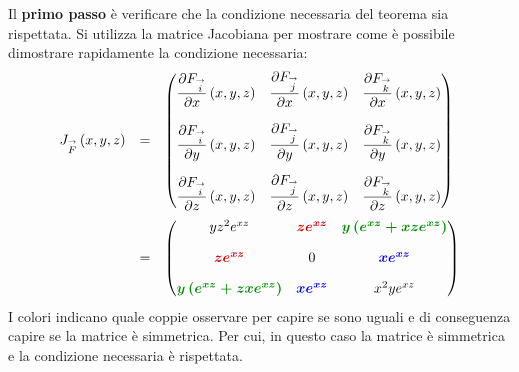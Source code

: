 \documentclass[a4paper]{article}
\makeatletter
\newenvironment{rowequmat}[1]{\left(\array{@{}#1@{}}}{\endarray\right)}
\makeatother
\begin{document}
	\noindent
	Il \textbf{primo passo} è verificare che la condizione necessaria del teorema sia rispettata. Si utilizza la matrice Jacobiana per mostrare come è possibile dimostrare rapidamente la condizione necessaria:
	\begin{equation*}
		\begin{array}{rcl}
			J_{\overset{\rightarrow}{F}}\left(x,y,z\right) &=& \begin{rowequmat}{c c c}
				\dfrac{\partial F_{\overset{\rightarrow}{i}}}{\partial x}\left(x,y,z\right) & \dfrac{\partial F_{\overset{\rightarrow}{j}}}{\partial x}\left(x,y,z\right) & \dfrac{\partial F_{\overset{\rightarrow}{k}}}{\partial x}\left(x,y,z\right) \\ [1.5em]
				\dfrac{\partial F_{\overset{\rightarrow}{i}}}{\partial y}\left(x,y,z\right) & \dfrac{\partial F_{\overset{\rightarrow}{j}}}{\partial y}\left(x,y,z\right) & \dfrac{\partial F_{\overset{\rightarrow}{k}}}{\partial y}\left(x,y,z\right) \\ [1.5em]
				\dfrac{\partial F_{\overset{\rightarrow}{i}}}{\partial z}\left(x,y,z\right) & \dfrac{\partial F_{\overset{\rightarrow}{j}}}{\partial z}\left(x,y,z\right) & \dfrac{\partial F_{\overset{\rightarrow}{k}}}{\partial z}\left(x,y,z\right)
			\end{rowequmat} \\ [5em]
			&=& \begin{rowequmat}{c c c}
				yz^{2}e^{xz} & \textcolor{Red3}{\boldsymbol{ze^{xz}}} & \textcolor{Green4}{\boldsymbol{y\left(e^{xz} + xze^{xz}\right)}} \\ [1em]
				\textcolor{Red3}{\boldsymbol{ze^{xz}}} & 0 & \textcolor{Blue2}{\boldsymbol{xe^{xz}}} \\ [1em]
				\textcolor{Green4}{\boldsymbol{y\left(e^{xz}+zxe^{xz}\right)}} & \textcolor{Blue2}{\boldsymbol{xe^{xz}}} & x^{2}ye^{xz}
			\end{rowequmat}
		\end{array}
	\end{equation*}
	I colori indicano quale coppie osservare per capire se sono uguali e di conseguenza capire se la matrice è simmetrica. Per cui, in questo caso la matrice è simmetrica e la condizione necessaria è rispettata.\newpage
\end{document}
